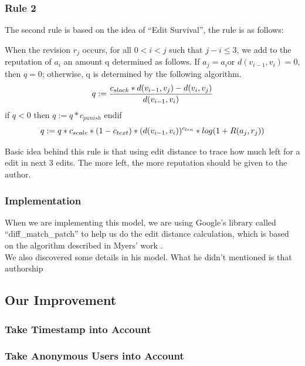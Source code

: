 \documentclass[preprint,review,12pt]{elsarticle}
\begin{document}
\subsubsection{Rule 2}
The second rule is based on the idea of ``Edit Survival'', the rule is as
follows:\\
\begin{ruullee}
  When the revision $r_j$ occurs, for all $0<i<j$ such that $j-i \leq 3$, we add
  to the reputation of $a_i$ an amount q determined as follows. If $a_j=a_i$or
  $d(v_{i-1}, v_i)=0$, then $q=0$; otherwise, q is determined by the following
  algorithm.
  \[
    \centering
    q := \frac{c_{slack}*d(v_{i-1},v_j) - d(v_i,v_j)}{d(v_{i-1},v_i)}
  \]
       if $q<0$ then $q:=q*c_{punish}$ endif
  \[
    \centering
    q := q*c_{scale}*(1-c_{text})*(d(v_{i-1}, v_i))^{c_{len}}*log(1+R(a_j,r_j))
  \]
\end{ruullee}
Basic idea behind this rule is that using edit distance to trace how much left
for a edit in next 3 edits. The more left, the more reputation should be given
to the author.

\subsubsection{Implementation}
When we are implementing this model, we are using Google's library called
``diff\_match\_patch'' to help us do the edit distance calculation, which is
based on the algorithm described in Myers' work \cite{myers1986ano}.\\
We also discovered some details in his model. What he didn't mentioned is that
authorship 


\subsection{Our Improvement}
\subsubsection{Take Timestamp into Account}
\subsubsection{Take Anonymous Users into Account}
\end{document}
